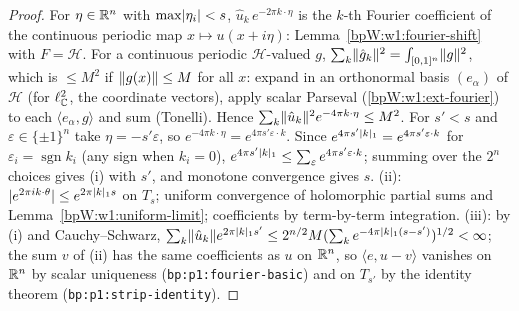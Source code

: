 \begin{proof}
\label{stepW:w1:shift}
For $\eta\in\mathbb{R}^n$ with $\max\lvert \eta_i\rvert<s$, $\hat u_k\,e^{-2\pi k\cdot\eta}$ is the $k$-th Fourier coefficient of the
continuous periodic map $x\mapsto u(x+i\eta)$: Lemma~\ref{bpW:w1:fourier-shift} with $F=\mathcal H$.
\label{stepW:w1:parseval}
For a continuous periodic $\mathcal H$-valued $g$, $\sum_k\lVert \hat g_k\rVert^2=\int_{[0,1]^n}\lVert g\rVert^2$, which is $\le M^2$ if $\lVert g(x)\rVert\le M$ for all $x$: expand
in an orthonormal basis $(e_\alpha)$ of $\mathcal H$ (for $\ell^2_{\mathbb{C}}$, the coordinate vectors), apply scalar Parseval
(\ref{bpW:w1:ext-fourier}) to each $\langle e_\alpha,g\rangle$ and sum (Tonelli). Hence
$\sum_k\lVert \hat u_k\rVert^2e^{-4\pi k\cdot\eta}\le M^2$.
\label{stepW:w1:orthants}
For $s'<s$ and $\varepsilon\in\{\pm1\}^n$ take $\eta=-s'\varepsilon$, so $e^{-4\pi k\cdot\eta}=e^{4\pi s'\varepsilon\cdot k}$. Since $e^{4\pi s'\lvert k\rvert_1}=e^{4\pi s'\varepsilon\cdot k}$
for $\varepsilon_i=\operatorname{sgn}k_i$ (any sign when $k_i=0$), $e^{4\pi s'\lvert k\rvert_1}\le\sum_\varepsilon e^{4\pi s'\varepsilon\cdot k}$;
summing over the $2^n$ choices gives (i) with $s'$, and monotone convergence gives $s$.
\label{stepW:w1:fsum}
(ii): $\lvert e^{2\pi ik\cdot\theta}\rvert\le e^{2\pi\lvert k\rvert_1s}$ on $T_s$; uniform convergence of holomorphic partial sums and
Lemma~\ref{bpW:w1:uniform-limit}; coefficients by term-by-term integration. (iii): by (i) and Cauchy--Schwarz,
$\sum_k\lVert \hat u_k\rVert e^{2\pi\lvert k\rvert_1s'}\le2^{n/2}M(\sum_ke^{-4\pi\lvert k\rvert_1(s-s')})^{1/2}<\infty$; the sum $v$ of (ii)
has the same coefficients as $u$ on $\mathbb{R}^n$, so $\langle e,u-v\rangle$ vanishes on $\mathbb{R}^n$ by scalar uniqueness
(\texttt{bp:p1:fourier-basic}) and on $T_{s'}$ by the identity theorem (\texttt{bp:p1:strip-identity}).
\end{proof}


